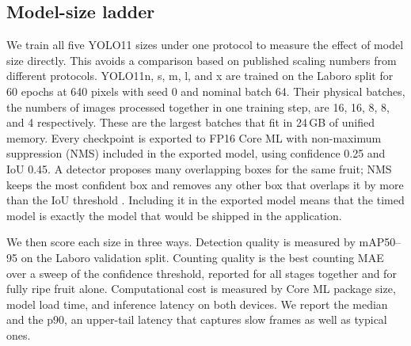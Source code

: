 \subsection{Model-size ladder}
\label{sec:ladder-method}

We train all five YOLO11 sizes under one protocol to measure the effect of model
size directly. This avoids a comparison based on published scaling numbers from
different protocols. YOLO11n, s, m, l, and x are trained on the Laboro split
for 60 epochs at 640 pixels with seed 0 and nominal batch 64. Their physical
batches, the numbers of images processed together in one training step, are 16,
16, 8, 8, and 4 respectively. These are the largest batches that fit in 24\,GB
of unified memory. Every checkpoint is exported to FP16 Core ML with
non-maximum suppression (NMS) included in the exported model, using confidence
0.25 and IoU 0.45. A detector proposes many overlapping boxes for the same
fruit; NMS keeps the most confident box and removes any other box that overlaps
it by more than the IoU threshold \cite{neubeck2006nms}. Including it in the exported
model means that the timed model is exactly the model that would be shipped in
the application.

We then score each size in three ways. Detection quality is measured by
mAP50--95 on the Laboro validation split. Counting quality is the best counting
MAE over a sweep of the confidence threshold, reported for all stages together
and for fully ripe fruit alone. Computational cost is measured by Core ML
package size, model load time, and inference latency on both devices. We report
the median and the p90, an upper-tail latency that captures slow frames as well
as typical ones.
